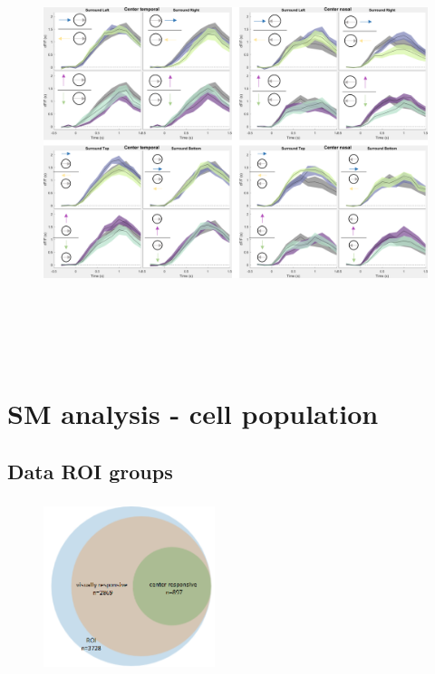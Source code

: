 \begin{figure}[H] \centering \includegraphics[width=12.5cm,height=12.5cm,keepaspectratio]{Figures/7.Results/individualSM/roi 46 mf379 pos2/surrs.png} 
\end{figure}

\section{SM analysis - cell population}

\subsection{Data ROI groups}

\begin{figure}[H] \centering \includegraphics[width=5cm,height=5cm,keepaspectratio]{Figures/7.Results/data/ROIvisualCenter.png} 
\end{figure}


